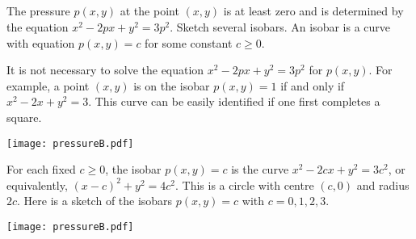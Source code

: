 \subsection*{\Application}

\begin{question}
The pressure $p(x,y)$ at the point $(x,y)$ is at least zero and is 
determined by the equation $x^2-2px+y^2=3p^2$. Sketch several isobars. 
An isobar is a curve with equation $p(x,y)=c$ for some constant $c\ge 0$.
\end{question}

\begin{hint}
It is not necessary to solve the equation $x^2-2px+y^2=3p^2$ for $p(x,y)$.
For example, a point $(x,y)$ is on the isobar $p(x,y)=1$ if and only if
$x^2-2x+y^2=3$. This curve can be easily identified if one first completes a 
square.
\end{hint}


\begin{answer}
\begin{center}
     \texttt{[image: pressureB.pdf]}
\end{center}

\end{answer}


\begin{solution}
For each fixed $c\ge 0$, the isobar $p(x,y)=c$ is the curve
$x^2-2cx+y^2=3c^2$, or equivalently, $(x-c)^2+y^2=4c^2$. This is a 
circle with centre $(c,0)$ and radius $2c$. Here is a sketch of the isobars
$p(x,y)=c$ with $c=0,1,2,3$.

\begin{center}
     \texttt{[image: pressureB.pdf]}
\end{center}


\end{solution}
